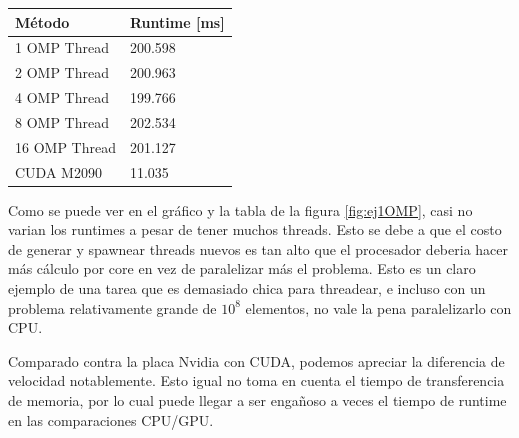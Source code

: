 \begin{table}
    \begin{tabular}{l|l}
        \textbf{M\'etodo} & \textbf{ Runtime [ms] }\\ \hline
    1 OMP Thread         & 200.598      \\
    2 OMP Thread          & 200.963      \\
    4 OMP Thread          & 199.766      \\
    8 OMP Thread  & 202.534      \\
    16 OMP Thread & 201.127      \\
        CUDA M2090 & 11.035 
    \end{tabular}
\end{table}



 Como se puede ver en el gr\'afico y la tabla de la figura \ref{fig:ej1OMP}, casi no varian los runtimes a pesar de tener
 muchos threads. Esto se debe a que el costo de generar y spawnear threads nuevos es tan alto que el procesador
 deberia hacer m\'as c\'alculo por core en vez de paralelizar m\'as el problema. Esto es un claro ejemplo
 de una tarea que es demasiado chica para threadear, e incluso con un problema relativamente grande de $10^8$ 
 elementos, no vale la pena paralelizarlo con CPU.

 Comparado contra la placa Nvidia con CUDA, podemos apreciar la diferencia de velocidad notablemente. Esto igual no toma
 en cuenta el tiempo de transferencia de memoria, por lo cual puede llegar a ser engañoso a veces el tiempo de runtime
 en las comparaciones CPU/GPU.
